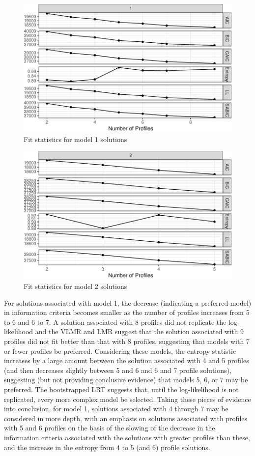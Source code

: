 \documentclass[]{book}
\theoremstyle{definition}
\theoremstyle{definition}
\theoremstyle{definition}
\theoremstyle{remark}
\begin{document}
\begin{figure}

{\centering \includegraphics[width=0.5\linewidth]{rosenberg-dissertation_files/figure-latex/model1-1} 

}

\caption{Fit statistics for model 1 solutions}\label{fig:model1}
\end{figure}

\begin{figure}

{\centering \includegraphics[width=0.4\linewidth]{rosenberg-dissertation_files/figure-latex/model2-1} 

}

\caption{Fit statistics for model 2 solutions}\label{fig:model2}
\end{figure}

For solutions associated with model 1, the decrease (indicating a
preferred model) in information criteria becomes smaller as the number
of profiles increases from 5 to 6 and 6 to 7. A solution associated with
8 profiles did not replicate the log-likelihood and the VLMR and LMR
suggest that the solution associated with 9 profiles did not fit better
than that with 8 profiles, suggesting that models with 7 or fewer
profiles be preferred. Considering these models, the entropy statistic
increases by a large amount between the solution associated with 4 and 5
profiles (and then decreases slightly between 5 and 6 and 6 and 7
profile solutions), suggesting (but not providing conclusive evidence)
that models 5, 6, or 7 may be preferred. The bootstrapped LRT suggests
that, until the log-likelihood is not replicated, every more complex
model be selected. Taking these pieces of evidence into conclusion, for
model 1, solutions associated with 4 through 7 may be considered in more
depth, with an emphasis on solutions associated with profiles with 5 and
6 profiles on the basis of the slowing of the decrease in the
information criteria associated with the solutions with greater profiles
than these, and the increase in the entropy from 4 to 5 (and 6) profile
solutions.
\end{document}

